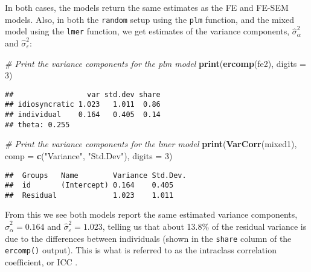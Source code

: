 \documentclass[]{interact}
\theoremstyle{plain}%
\theoremstyle{definition}
\theoremstyle{remark}
\newenvironment{Shaded}{\begin{snugshade}}{\end{snugshade}}
\newcommand{\CommentTok}[1]{\textcolor[rgb]{0.56,0.35,0.01}{\textit{#1}}}
\newcommand{\DataTypeTok}[1]{\textcolor[rgb]{0.13,0.29,0.53}{#1}}
\newcommand{\DecValTok}[1]{\textcolor[rgb]{0.00,0.00,0.81}{#1}}
\newcommand{\KeywordTok}[1]{\textcolor[rgb]{0.13,0.29,0.53}{\textbf{#1}}}
\newcommand{\NormalTok}[1]{#1}
\newcommand{\StringTok}[1]{\textcolor[rgb]{0.31,0.60,0.02}{#1}}
\begin{document}
\doublespacing

In both cases, the models return the same estimates as the FE and FE-SEM
models. Also, in both the \texttt{random} setup using the \texttt{plm}
function, and the mixed model using the \texttt{lmer} function, we get
estimates of the variance components, \(\hat{\sigma}^{2}_{\alpha}\) and
\(\hat{\sigma}^{2}_{\varepsilon}\):

\singlespacing

\begin{Shaded}
\begin{Highlighting}[]
\CommentTok{\# Print the variance components for the plm model  }
\KeywordTok{print}\NormalTok{(}\KeywordTok{ercomp}\NormalTok{(fe2), }
      \DataTypeTok{digits =} \DecValTok{3}\NormalTok{)}
\end{Highlighting}
\end{Shaded}

\begin{verbatim}
##                 var std.dev share
## idiosyncratic 1.023   1.011  0.86
## individual    0.164   0.405  0.14
## theta: 0.255
\end{verbatim}

\begin{Shaded}
\begin{Highlighting}[]
\CommentTok{\# Print the variance components for the lmer model }
\KeywordTok{print}\NormalTok{(}\KeywordTok{VarCorr}\NormalTok{(mixed1), }
      \DataTypeTok{comp =} \KeywordTok{c}\NormalTok{(}\StringTok{"Variance"}\NormalTok{, }\StringTok{"Std.Dev"}\NormalTok{), }
      \DataTypeTok{digits =} \DecValTok{3}\NormalTok{)}
\end{Highlighting}
\end{Shaded}

\begin{verbatim}
##  Groups   Name        Variance Std.Dev.
##  id       (Intercept) 0.164    0.405   
##  Residual             1.023    1.011
\end{verbatim}

\doublespacing

From this we see both models report the same estimated variance
components, \(\hat{\sigma}^{2}_{\alpha} = 0.164\) and
\(\hat{\sigma}^{2}_{\varepsilon} = 1.023\), telling us that about 13.8\%
of the residual variance is due to the differences between individuals
(shown in the \texttt{share} column of the \texttt{ercomp()} output).
This is what is referred to as the intraclass correlation coefficient,
or ICC \citep{Hox2010}.
\end{document}
